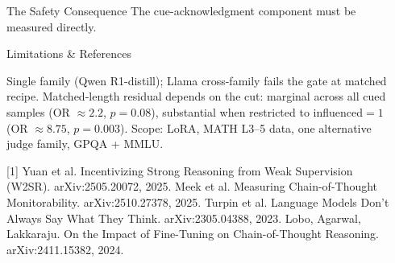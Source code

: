\documentclass[final]{beamer}
\newlength{\sepwidth}
\newlength{\colwidth}
\newcommand{\separatorcolumn}{\begin{column}{\sepwidth}\end{column}}
\begin{document}
\begin{frame}[t]
\begin{columns}[t]
\begin{column}{\colwidth}
\begin{block}{The Safety Consequence}
    The cue-acknowledgment component must be measured directly.

  \end{block}

  \begin{block}{Limitations \& References}

    Single family (Qwen R1-distill); Llama cross-family fails the gate at matched recipe. Matched-length residual depends on the cut: marginal across all cued samples (OR $\approx 2.2$, $p \!=\! 0.08$), substantial when restricted to influenced$\!=\!1$ (OR $\approx 8.75$, $p \!=\! 0.003$). Scope: LoRA, MATH L3--5 data, one alternative judge family, GPQA + MMLU.

    \smallskip
    \small{
    [1] Yuan et al. Incentivizing Strong Reasoning from Weak Supervision (W2SR). arXiv:2505.20072, 2025. \quad [2] Meek et al. Measuring Chain-of-Thought Monitorability. arXiv:2510.27378, 2025. \quad [3] Turpin et al. Language Models Don't Always Say What They Think. arXiv:2305.04388, 2023. \quad [4] Lobo, Agarwal, Lakkaraju. On the Impact of Fine-Tuning on Chain-of-Thought Reasoning. arXiv:2411.15382, 2024.
    }
  \end{block}

\end{column}

\separatorcolumn
\end{columns}
\end{frame}
\end{document}
